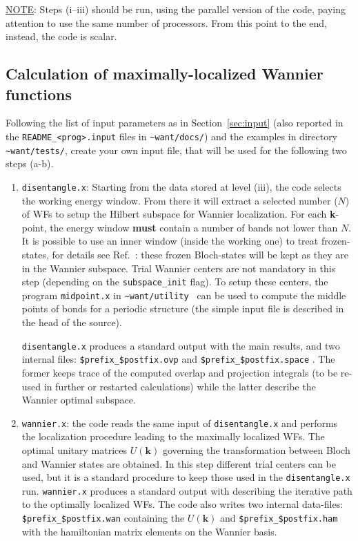 \noindent \underline{NOTE}: Steps (i--iii) should be run, using the
parallel version of the code, paying attention to use the same
number of processors. From this point to the end, instead, the
code is scalar.

\subsection {Calculation of maximally-localized Wannier
functions}\label{subsection:run_wannier}

Following the list of input parameters as in
Section~\ref{sec:input} (also reported in the {\tt README\_<prog>.input} files
in {\tt \~{}want/docs/}) and the examples in directory {\tt \~{}want/tests/},
create your own input file, that will be used for the following two steps (a-b).
\renewcommand{\theenumi}{\alph{enumi}}
\renewcommand{\labelenumi}{\theenumi)}
%
%
\begin{enumerate}
\item {\tt disentangle.x}: Starting from the data stored at level (iii),
      the code selects the working energy window. From there
      it will extract a selected number ($N$) of WFs to setup the
      Hilbert subspace for Wannier localization.
      For each \textbf{k}-point, the energy window {\bf must}
      contain a number of bands not lower than $N$.
      It is possible to use an inner window (inside the working one) to
      treat frozen-states, for details see Ref.~\cite{ivo2}:
      these frozen Bloch-states will be kept as they are in the Wannier subspace.
      Trial Wannier centers are not mandatory in this step (depending
      on the {\tt subspace\_init} flag).
      To setup these centers, the program {\tt midpoint.x} in 
      {\tt \~{}want/utility } can be used to compute
      the middle points of bonds for a periodic structure (the simple input file 
      is described in the head of the source). 

      {\tt disentangle.x} produces a standard output with the main results,
      and two internal files: {\tt \$prefix\_\$postfix.ovp} and
      {\tt \$prefix\_\$postfix.space} . The former keeps trace of the
      computed overlap and projection integrals (to be re-used in further
      or restarted calculations) while the latter describe the Wannier optimal
      subspace.

\item {\tt wannier.x}: the code reads the same input of {\tt disentangle.x} and
      performs the localization
      procedure leading to the maximally localized WFs.
      The optimal unitary matrices $U(\mathbf{k})$ governing the transformation between
      Bloch and Wannier states are obtained.
      In this step different trial centers can be used, but it is a standard procedure
      to keep those used in the {\tt disentangle.x} run.
      {\tt wannier.x} produces a standard output with describing the iterative
      path to the optimally localized WFs.
      The code also writes two internal data-files: {\tt \$prefix\_\$postfix.wan}
      containing the $U(\mathbf{k})$ and {\tt \$prefix\_\$postfix.ham} with the
      hamiltonian matrix elements on the Wannier basis.
\end{enumerate}
